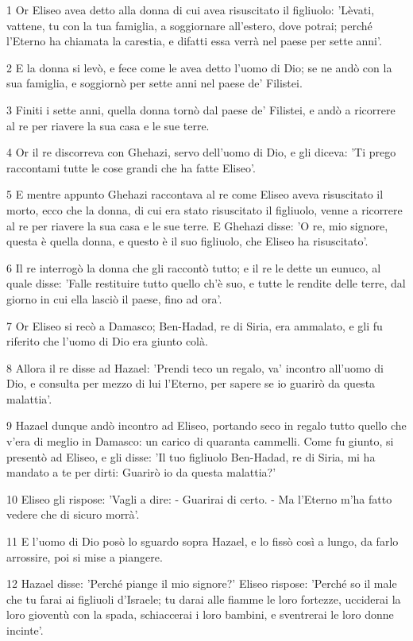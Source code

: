 \par 1 Or Eliseo avea detto alla donna di cui avea risuscitato il figliuolo: 'Lèvati, vattene, tu con la tua famiglia, a soggiornare all'estero, dove potrai; perché l'Eterno ha chiamata la carestia, e difatti essa verrà nel paese per sette anni'.
\par 2 E la donna si levò, e fece come le avea detto l'uomo di Dio; se ne andò con la sua famiglia, e soggiornò per sette anni nel paese de' Filistei.
\par 3 Finiti i sette anni, quella donna tornò dal paese de' Filistei, e andò a ricorrere al re per riavere la sua casa e le sue terre.
\par 4 Or il re discorreva con Ghehazi, servo dell'uomo di Dio, e gli diceva: 'Ti prego raccontami tutte le cose grandi che ha fatte Eliseo'.
\par 5 E mentre appunto Ghehazi raccontava al re come Eliseo aveva risuscitato il morto, ecco che la donna, di cui era stato risuscitato il figliuolo, venne a ricorrere al re per riavere la sua casa e le sue terre. E Ghehazi disse: 'O re, mio signore, questa è quella donna, e questo è il suo figliuolo, che Eliseo ha risuscitato'.
\par 6 Il re interrogò la donna che gli raccontò tutto; e il re le dette un eunuco, al quale disse: 'Falle restituire tutto quello ch'è suo, e tutte le rendite delle terre, dal giorno in cui ella lasciò il paese, fino ad ora'.
\par 7 Or Eliseo si recò a Damasco; Ben-Hadad, re di Siria, era ammalato, e gli fu riferito che l'uomo di Dio era giunto colà.
\par 8 Allora il re disse ad Hazael: 'Prendi teco un regalo, va' incontro all'uomo di Dio, e consulta per mezzo di lui l'Eterno, per sapere se io guarirò da questa malattia'.
\par 9 Hazael dunque andò incontro ad Eliseo, portando seco in regalo tutto quello che v'era di meglio in Damasco: un carico di quaranta cammelli. Come fu giunto, si presentò ad Eliseo, e gli disse: 'Il tuo figliuolo Ben-Hadad, re di Siria, mi ha mandato a te per dirti: Guarirò io da questa malattia?'
\par 10 Eliseo gli rispose: 'Vagli a dire: - Guarirai di certo. - Ma l'Eterno m'ha fatto vedere che di sicuro morrà'.
\par 11 E l'uomo di Dio posò lo sguardo sopra Hazael, e lo fissò così a lungo, da farlo arrossire, poi si mise a piangere.
\par 12 Hazael disse: 'Perché piange il mio signore?' Eliseo rispose: 'Perché so il male che tu farai ai figliuoli d'Israele; tu darai alle fiamme le loro fortezze, ucciderai la loro gioventù con la spada, schiaccerai i loro bambini, e sventrerai le loro donne incinte'.
